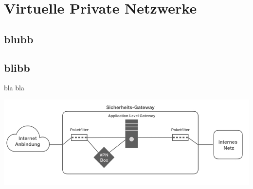 \chapter{Virtuelle Private Netzwerke}

\section{blubb}

\section{blibb}

bla bla 

\includegraphics[width=\linewidth]{vpnarchitektur.jpeg}